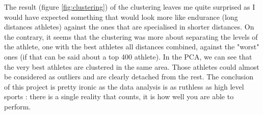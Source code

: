 \documentclass[10pt, a4paper]{article}
\begin{document}
The result (figure \ref{fig:clustering}) of the clustering leaves me quite surprised as I would have expected something that would look more like endurance (long distances athletes) against the ones that are specialised in shorter distances. On the contrary, it seems that the clustering was more about separating the levels of the athlete, one with the best athletes all distances combined, against the "worst" ones (if that can be said about a top 400 athlete). In the PCA, we can see that the very best athletes are clustered in the same area. Those athletes could almost be considered as outliers and are clearly detached from the rest.
The conclusion of this project is pretty ironic as the data analysis is as ruthless as high level sports : there is a single reality that counts, it is how well you are able to perform.
\end{document}
